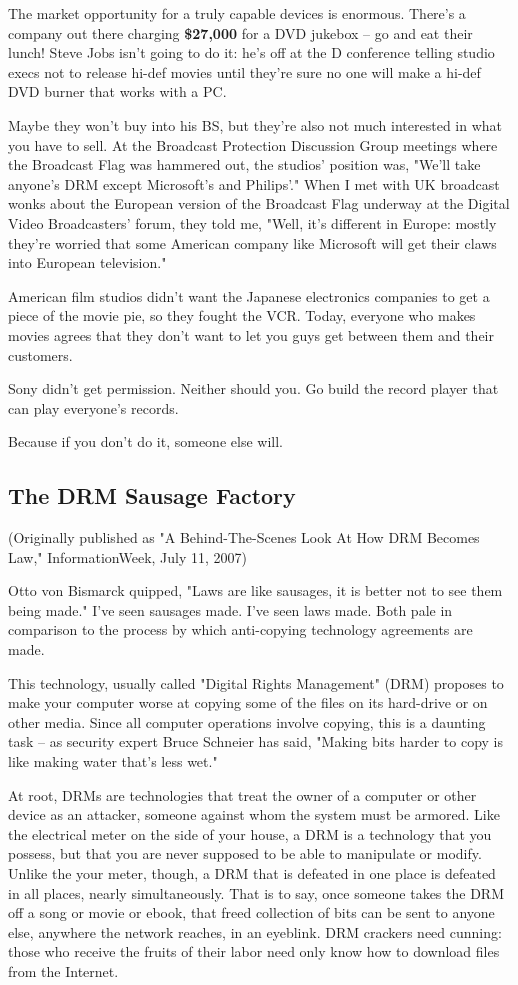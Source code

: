 The market opportunity for a truly capable devices is enormous.
There's a company out there charging \textbf{\$27,000} for a DVD
jukebox -- go and eat their lunch! Steve Jobs isn't going to do it:
he's off at the D conference telling studio execs not to release
hi-def movies until they're sure no one will make a hi-def DVD
burner that works with a PC.

Maybe they won't buy into his BS, but they're also not much
interested in what you have to sell. At the Broadcast Protection
Discussion Group meetings where the Broadcast Flag was hammered
out, the studios' position was, "We'll take anyone's DRM except
Microsoft's and Philips'." When I met with UK broadcast wonks about
the European version of the Broadcast Flag underway at the Digital
Video Broadcasters' forum, they told me, "Well, it's different in
Europe: mostly they're worried that some American company like
Microsoft will get their claws into European television."

American film studios didn't want the Japanese electronics
companies to get a piece of the movie pie, so they fought the VCR.
Today, everyone who makes movies agrees that they don't want to let
you guys get between them and their customers.

Sony didn't get permission. Neither should you. Go build the record
player that can play everyone's records.

Because if you don't do it, someone else will.

\subsection{The DRM Sausage Factory}

(Originally published as "A Behind-The-Scenes Look At How DRM
Becomes Law," InformationWeek, July 11, 2007)

Otto von Bismarck quipped, "Laws are like sausages, it is better
not to see them being made." I've seen sausages made. I've seen
laws made. Both pale in comparison to the process by which
anti-copying technology agreements are made.

This technology, usually called "Digital Rights Management" (DRM)
proposes to make your computer worse at copying some of the files
on its hard-drive or on other media. Since all computer operations
involve copying, this is a daunting task -- as security expert
Bruce Schneier has said, "Making bits harder to copy is like making
water that's less wet."

At root, DRMs are technologies that treat the owner of a computer
or other device as an attacker, someone against whom the system
must be armored. Like the electrical meter on the side of your
house, a DRM is a technology that you possess, but that you are
never supposed to be able to manipulate or modify. Unlike the your
meter, though, a DRM that is defeated in one place is defeated in
all places, nearly simultaneously. That is to say, once someone
takes the DRM off a song or movie or ebook, that freed collection
of bits can be sent to anyone else, anywhere the network reaches,
in an eyeblink. DRM crackers need cunning: those who receive the
fruits of their labor need only know how to download files from the
Internet.

